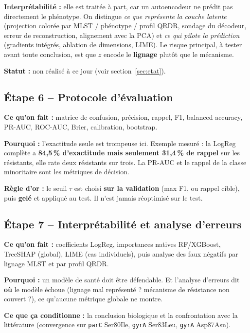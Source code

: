 \documentclass[11pt,a4paper]{article}
\begin{document}
\textbf{Interprétabilité :} elle est traitée à part, car un autoencodeur ne prédit pas directement le phénotype. On distingue \emph{ce que représente la couche latente} (projection colorée par MLST / phénotype / profil QRDR, sondage du décodeur, erreur de reconstruction, alignement avec la PCA) et \emph{ce qui pilote la prédiction} (gradients intégrés, ablation de dimensions, LIME). Le risque principal, à tester avant toute conclusion, est que \(z\) encode le \textbf{lignage} plutôt que le mécanisme.

\textbf{Statut :} non réalisé à ce jour (voir section~\ref{sec:etat}).

\subsection{Étape 6 -- Protocole d'évaluation}
\textbf{Ce qu'on fait :} matrice de confusion, précision, rappel, F1, balanced accuracy, PR-AUC, ROC-AUC, Brier, calibration, bootstrap.

\textbf{Pourquoi :} l'exactitude seule est trompeuse ici. Exemple mesuré : la LogReg complète a \textbf{84,5\,\% d'exactitude mais seulement 31,4\,\% de rappel} sur les résistants, elle rate deux résistants sur trois. La PR-AUC et le rappel de la classe minoritaire sont les métriques de décision.

\textbf{Règle d'or :} le seuil $\tau$ est choisi \textbf{sur la validation} (max F1, ou rappel cible), puis \textbf{gelé} et appliqué au test. Il n'est jamais réoptimisé sur le test.

\subsection{Étape 7 -- Interprétabilité et analyse d'erreurs}
\textbf{Ce qu'on fait :} coefficients LogReg, importances natives RF/XGBoost, TreeSHAP (global), LIME (cas individuels), puis analyse des faux négatifs par lignage MLST et par profil QRDR.

\textbf{Pourquoi :} un modèle de santé doit être défendable. Et l'analyse d'erreurs dit \textbf{où} le modèle échoue (lignage mal représenté ? mécanisme de résistance non couvert ?), ce qu'aucune métrique globale ne montre.

\textbf{Ce que ça conditionne :} la conclusion biologique et la confrontation avec la littérature (convergence sur \texttt{parC} Ser80Ile, \texttt{gyrA} Ser83Leu, \texttt{gyrA} Asp87Asn).

\end{document}
